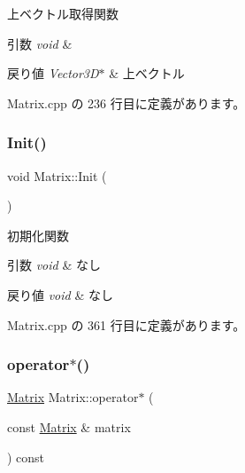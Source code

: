 上ベクトル取得関数 


\begin{DoxyParams}{引数}
{\em void} & \\
\hline
\end{DoxyParams}

\begin{DoxyRetVals}{戻り値}
{\em Vector3\+D$\ast$} & 上ベクトル \\
\hline
\end{DoxyRetVals}


 Matrix.\+cpp の 236 行目に定義があります。

\mbox{\label{class_matrix_ab37ebbd9de3da47ebdcf332cebcc0cc0}} 
\subsubsection{\texorpdfstring{Init()}{Init()}}
{\footnotesize\ttfamily void Matrix\+::\+Init (\begin{DoxyParamCaption}{ }\end{DoxyParamCaption})}



初期化関数 


\begin{DoxyParams}{引数}
{\em void} & なし \\
\hline
\end{DoxyParams}

\begin{DoxyRetVals}{戻り値}
{\em void} & なし \\
\hline
\end{DoxyRetVals}


 Matrix.\+cpp の 361 行目に定義があります。

\mbox{\label{class_matrix_aa2f78f6d34450195fec250fee6172afd}} 
\subsubsection{\texorpdfstring{operator$\ast$()}{operator*()}}
{\footnotesize\ttfamily \mbox{\hyperlink{class_matrix}{Matrix}} Matrix\+::operator$\ast$ (\begin{DoxyParamCaption}\item[{const \mbox{\hyperlink{class_matrix}{Matrix}} \&}]{matrix }\end{DoxyParamCaption}) const}



